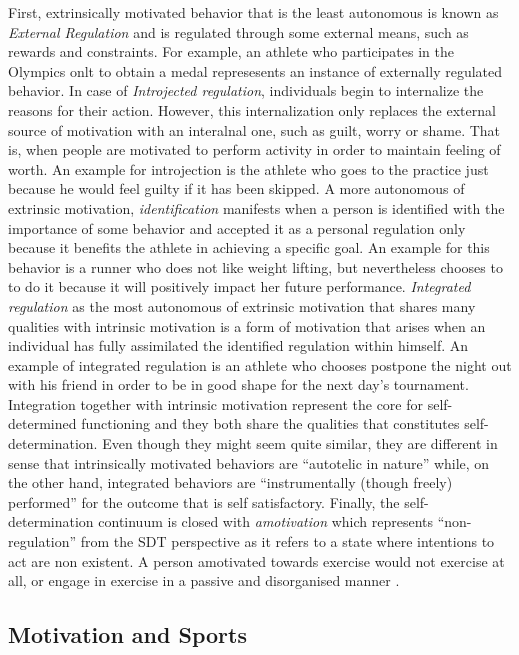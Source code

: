 First, extrinsically motivated behavior that is the least autonomous is known as \textit{External Regulation} and is regulated through some external means, such as rewards and constraints. For example, an athlete who participates in the Olympics onlt to obtain a medal represesents an instance of externally regulated behavior. In case of \textit{Introjected regulation}, individuals begin to internalize the reasons for their action. However, this internalization only replaces the external source of motivation with an interalnal one, such as guilt, worry or shame. That is, when people are motivated to perform activity in order to maintain feeling of worth. An example for introjection is the athlete who goes to the practice just because he would feel guilty if it has been skipped. A more autonomous of extrinsic motivation, \textit{identification} manifests when a person is identified with the importance of some behavior and accepted it as a personal regulation only because it benefits the athlete in achieving a specific goal. An example for this behavior is a runner who does not like weight lifting, but nevertheless chooses to to do it because it will positively impact her future performance. \textit{Integrated regulation} as the most autonomous of extrinsic motivation that shares many qualities with intrinsic motivation is a form of motivation that arises when an individual has fully assimilated the identified regulation within himself. An example of integrated regulation is an athlete who chooses postpone the night out with his friend in order to be in good shape for the next day's tournament. Integration together with intrinsic motivation represent the core for self-determined functioning and they both share the qualities that constitutes self-determination. Even though they might seem quite similar, they are different in sense that intrinsically motivated behaviors are ``autotelic in nature'' while, on the other hand, integrated behaviors are ``instrumentally (though freely) performed'' for the outcome that is self satisfactory.  Finally, the self-determination continuum is closed with  \textit{amotivation} which represents ``non-regulation'' from the SDT perspective as it refers to a state where intentions to act are non existent. A person amotivated towards exercise would not exercise at all, 
or engage in exercise in a passive and disorganised  manner \cite{vallerand2007intrinsic, ryan2000intrinsic, deci1994promoting}.

\subsection{Motivation and Sports}

